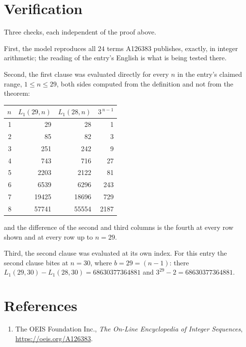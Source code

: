 \documentclass[11pt,a4paper]{article}
\theoremstyle{plain}
\theoremstyle{definition}
\begin{document}
\section{Verification}

Three checks, each independent of the proof above.

First, the model reproduces all $24$ terms A126383 publishes, exactly, in integer
arithmetic; the reading of the entry's English is what is being tested there.

Second, the first clause was evaluated directly for every $n$ in the entry's claimed range,
$1\le n\le29$, both sides computed from the definition and not from the theorem:

\begin{center}
\begin{tabular}{rrrr}
$n$ & $L_{1}(29,n)$ & $L_{1}(28,n)$ & $3^{\,n-1}$ \\ \hline
1 & 29 & 28 & 1 \\
2 & 85 & 82 & 3 \\
3 & 251 & 242 & 9 \\
4 & 743 & 716 & 27 \\
5 & 2203 & 2122 & 81 \\
6 & 6539 & 6296 & 243 \\
7 & 19425 & 18696 & 729 \\
8 & 57741 & 55554 & 2187 \\
\end{tabular}
\end{center}

\noindent and the difference of the second and third columns is the fourth at every row shown
and at every row up to $n=29$.

Third, the second clause was evaluated at its own index. For this entry the second clause bites at $n=30$, where $b=29=(n-1)$: there $L_{1}(29,30)-L_{1}(28,30)=68630377364881$ and $3^{29}-2=68630377364881$.

\section*{References}
\begin{enumerate}
\item The OEIS Foundation Inc., \emph{The On-Line Encyclopedia of Integer Sequences},
\url{https://oeis.org/A126383}.
\end{enumerate}
\end{document}
